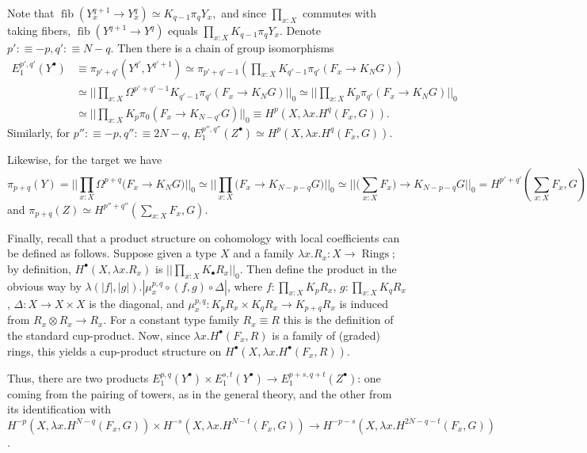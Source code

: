 \documentclass{amsart}
\theoremstyle{definition}
\newcommand{\fib}{\operatorname{fib}}
\newcommand{\tot}[2]{\sum\limits_{#1}^{}{#2}}
\newcommand{\depfun}[2]{\prod\limits_{#1}^{}{#2}}
\begin{document}
Note that $\fib({Y^{q+1}_x \to Y^{q}_x}) \simeq K_{q-1}\pi_qY_x,$ and since $\depfun{x:X}{}$ commutes with taking fibers, $\fib({Y^{q+1} \to Y^q})$ equals $\depfun{x:X}{K_{q-1}\pi_qY_x}$.
    Denote $p' :\equiv -p, q' :\equiv N - q$. Then there is a chain of group isomorphisms
    \begin{align*}
    E_1^{p',q'}(Y^{\bullet}) &\equiv \pi_{p'+q'}(Y^{q'}, Y^{q'+1}) \simeq \pi_{p'+q'-1}(\depfun{x:X}{K_{q'-1}\pi_{q'}(F_x \to K_N G)}) \\
    &\simeq ||\depfun{x:X}{\Omega^{p'+q'-1}K_{q'-1}\pi_{q'}(F_x \to K_N G)}||_0 \simeq ||\depfun{x:X}{K_p\pi_{q'}(F_x \to K_N G)}||_0 \\
    &\simeq ||\depfun{x:X}{K_p\pi_{0}(F_x \to K_{N-q'}G)}||_0 \equiv H^p(X, \lambda x. H^q(F_x, G)).
    \end{align*}
    Similarly, for $p'' :\equiv -p, q'' :\equiv 2N - q$, $E^{p'',q''}_1(Z^\bullet) \simeq H^p(X, \lambda x. H^q(F_x, G))$.

Likewise, for the target we have
$$\pi_{p+q}(Y) = ||\depfun{x:X}{\Omega^{p+q}(F_x\to K_NG}) ||_0 \simeq ||\depfun{x:X}{(F_x\to K_{N-p-q}G}) ||_0 \simeq ||(\tot{x:X}{{F_x}) \to K_{N-p-q}G}||_0 = H^{p'+q'}(\tot{x:X}{F_x}, G)$$
and $\pi_{p+q}(Z) \simeq H^{p''+q''}(\tot{x:X}{F_x}, G).$



Finally, recall that a product structure on cohomology with local coefficients can be defined as follows. Suppose given a type $X$ and a family $\lambda x.R_x: X \to \operatorname{Rings}$; by definition, $H^\bullet(X, \lambda x.R_x)$ is $||\depfun{x:X}{K_\bullet R_x}||_0$. Then define the product in the obvious way by $\lambda(|f|, |g|).|\mu^{p,q}_x \circ (f, g) \circ \Delta|$, where $f: \depfun{x:X}{K_p R_x}$, $g: \depfun{x:X}{K_q R_x}$, $\Delta: X \to X \times X$ is the diagonal, and $\mu^{p,q}_x: K_p R_x \times K_qR_x \to K_{p+q}
R_x$ is induced from $R_x \otimes R_x \to R_x$. For a constant type family $R_x \equiv R$ this is the definition of the standard cup-product. Now, since $\lambda x. H^\bullet(F_x, R)$ is a family of (graded) rings, this yields a cup-product structure on $H^\bullet(X, \lambda x. H^\bullet(F_x, R))$.

Thus, there are two products $E_1^{p,q}(Y^\bullet) \times E_1^{s,t}(Y^\bullet) \to E_1^{p+s,q+t}(Z^\bullet)$: one coming from the pairing of towers, as in the general theory, and the other from its identification with $H^{-p}(X , \lambda x.H^{N-q}(F_x, G)) \times H^{-s}(X , \lambda x.H^{N-t}(F_x, G)) \to H^{-p-s}(X , \lambda x.H^{2N-q-t}(F_x, G))$.
\end{document}
